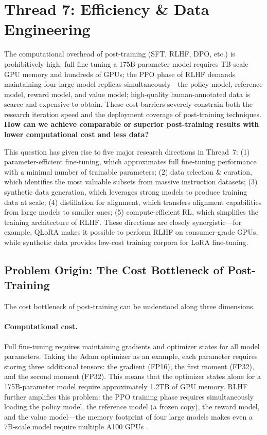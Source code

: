 \section{Thread 7: Efficiency \& Data Engineering}
\label{sec:t7}

\begin{problembox}
The computational overhead of post-training (SFT, RLHF, DPO, etc.) is prohibitively high:
full fine-tuning a 175B-parameter model requires TB-scale GPU memory and hundreds of GPUs;
the PPO phase of RLHF demands maintaining four large model replicas simultaneously---the policy model, reference model, reward model, and value model;
high-quality human-annotated data is scarce and expensive to obtain.
These cost barriers severely constrain both the research iteration speed and the deployment coverage of post-training techniques.
\textbf{How can we achieve comparable or superior post-training results with lower computational cost and less data?}
\end{problembox}

\noindent
This question has given rise to five major research directions in Thread~7:
(1) parameter-efficient fine-tuning, which approximates full fine-tuning performance with a minimal number of trainable parameters;
(2) data selection \& curation, which identifies the most valuable subsets from massive instruction datasets;
(3) synthetic data generation, which leverages strong models to produce training data at scale;
(4) distillation for alignment, which transfers alignment capabilities from large models to smaller ones;
(5) compute-efficient RL, which simplifies the training architecture of RLHF.
These directions are closely synergistic---for example, QLoRA makes it possible to perform RLHF on consumer-grade GPUs, while synthetic data provides low-cost training corpora for LoRA fine-tuning.

\subsection{Problem Origin: The Cost Bottleneck of Post-Training}
\label{sec:t7-origin}

The cost bottleneck of post-training can be understood along three dimensions.

\paragraph{Computational cost.}
Full fine-tuning requires maintaining gradients and optimizer states for all model parameters.
Taking the Adam optimizer as an example, each parameter requires storing three additional tensors: the gradient (FP16), the first moment (FP32), and the second moment (FP32).
This means that the optimizer states alone for a 175B-parameter model require approximately 1.2TB of GPU memory.
RLHF further amplifies this problem:
the PPO training phase requires simultaneously loading the policy model, the reference model (a frozen copy), the reward model, and the value model---the memory footprint of four large models makes even a 7B-scale model require multiple A100 GPUs \cite{santacroce2023efficient}.

